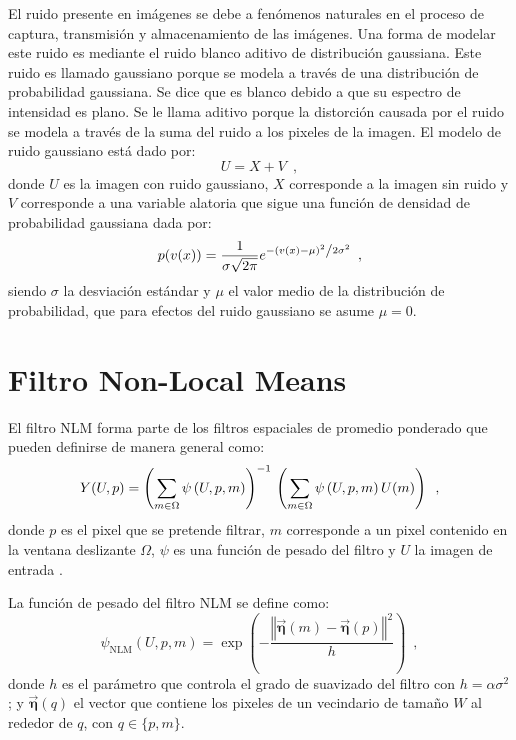 El ruido presente en im\'agenes se debe a fenómenos naturales en el proceso de captura, transmisión y almacenamiento de las im\'agenes. 	Una forma de modelar este ruido es mediante el ruido blanco aditivo de distribución gaussiana. Este ruido es llamado gaussiano porque se modela a través de una distribución de probabilidad gaussiana. Se dice que es blanco debido a que su espectro de intensidad es plano. Se le llama aditivo porque la distorción causada por el ruido se modela a través de la suma del ruido a los pixeles de la imagen. El modelo de ruido gaussiano  est\'a dado por:
%
\begin{equation}
\label{eq:modelruido}
U = X + V \enspace ,
\end{equation}
%
donde $U$ es la imagen con ruido gaussiano, $X$ corresponde a la imagen sin ruido y $V$ corresponde a una variable alatoria que sigue una función de densidad de probabilidad gaussiana dada por: 
%
\begin{equation}
\label{eq:probfuncgauus}
p(v(x)) = \frac{1}{{\sigma \sqrt {2\pi } }}e^{{{ - \left( {v(x) - \mu } \right)^2 } \mathord{\left/ {\vphantom {{ - \left( {x - \mu } \right)^2 } {2\sigma ^2 }}} \right. \kern-\nulldelimiterspace} {2\sigma ^2 }}} \enspace ,
\end{equation}
%
siendo $\sigma$ la desviación est\'andar  y $\mu$ el valor medio de la distribución de probabilidad, que para efectos del ruido gaussiano se asume $\mu = 0$.


\section{Filtro Non-Local Means}
\label{ch:marco_nlm}

El filtro NLM forma parte de los filtros espaciales de promedio ponderado que pueden definirse de manera general como:
%
\begin{equation}
\label{eq:weighted}
Y(U,p)=\left(\sum_{m\in \Omega}\psi\left(U, p, m\right)\right)^{-1} \\ \left(\sum_{m\in \Omega}\psi\left(U, p, m\right)U(m)\right) \enspace ,
\end{equation}
%
donde $p$ es el pixel que se pretende filtrar, $m$ corresponde a un pixel contenido en la ventana deslizante $\Omega$, $\psi$ es una función de pesado del filtro y $U$ la imagen de entrada \cite{calderon2015dewaff}.

La función de pesado del filtro NLM se define como:
%
\begin{equation}
\label{eq:nlmfunc}
\psi_{\textrm{NLM}}\left(U,p,m\right) = \exp\left(-\frac{\left\Vert \vec{\boldsymbol{\eta}}\left(m\right)-\vec{\boldsymbol{\eta}}\left(p\right)\right\Vert^2 }{h}\right) \enspace ,
\end{equation}
%
donde $h$ es el par\'ametro que controla el grado de suavizado del filtro con $h = \alpha\sigma^{2}$; y $\vec{\boldsymbol{\eta}}\left(q\right)$ el vector que contiene los pixeles de un vecindario de tama\~no $W$ al rededor de $q$, con $q \in \{p,m\}$.

